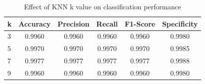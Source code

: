 \begin{table}[htbp]
\centering
\caption{Effect of KNN k value on classification performance}
\label{tab:table13}
\begin{tabular}{lccccc}
\toprule
k & Accuracy & Precision & Recall & F1-Score & Specificity \\
\midrule
3 & 0.9960 & 0.9960 & 0.9960 & 0.9960 & 0.9980 \\
5 & 0.9970 & 0.9970 & 0.9970 & 0.9970 & 0.9985 \\
7 & 0.9977 & 0.9977 & 0.9977 & 0.9977 & 0.9988 \\
9 & 0.9960 & 0.9960 & 0.9960 & 0.9960 & 0.9980 \\
\bottomrule
\end{tabular}
\end{table}